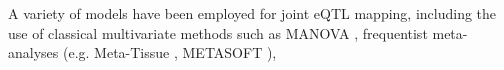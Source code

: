 %
%
A variety of models have been employed for joint \gls{eQTL} mapping, including
the use of classical multivariate methods such as \gls{MANOVA} \autocite{kim2014CharacterizingGeneticBasis},
frequentist meta-analyses (e.g. Meta-Tissue \autocite{sul2013EffectivelyIdentifyingEQTLs}, METASOFT \autocite{han2011RandomEffectsModelAimed}), 
